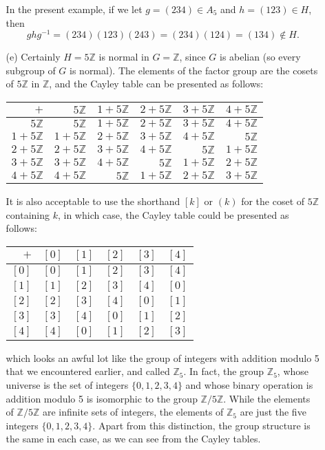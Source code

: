 \documentclass[12pt,reqno]{amsart}
\newcommand{\Z}{\ensuremath{\mathbb{Z}}}
\newcommand{\<}{\ensuremath{\langle}}
\renewcommand{\>}{\ensuremath{\rangle}}
\begin{document}
\begin{enumerate}
\begin{enumerate}
In the present example, if we let $g = (234) \in A_5$ and $h = (123) \in H$,
then 
\[
ghg^{-1}  = (234)(123)(243) = (234)(124) = (134) \notin H.
\]
\item[(e)]
Certainly $H = 5 {\mathbb Z}$ is normal in $G = {\mathbb Z}$, since $G$ is
abelian (so every subgroup of $G$ is normal).  The elements of the factor group
are the cosets of $5\Z$ in $\Z$, and the Cayley table can be presented as follows:
\medskip
\begin{center}
\begin{tabular}{r|rrrrr}
  $+$ & $5\Z$ &$1+5\Z$&$2+5\Z$&$3+5\Z$&$4+5\Z$ \\
\hline
  $5\Z$ & $5\Z$ &$1+5\Z$&$2+5\Z$&$3+5\Z$&$4+5\Z$ \\
  $1+5\Z$ &$1+5\Z$&$2+5\Z$&$3+5\Z$&$4+5\Z$& $5\Z$  \\
  $2+5\Z$ &$2+5\Z$&$3+5\Z$&$4+5\Z$& $5\Z$&$1+5\Z$  \\
  $3+5\Z$ &$3+5\Z$&$4+5\Z$& $5\Z$&$1+5\Z$&$2+5\Z$  \\
  $4+5\Z$ &$4+5\Z$& $5\Z$&$1+5\Z$&$2+5\Z$&$3+5\Z$
\end{tabular}
\end{center}
\medskip

It is also acceptable to use the shorthand $[k]$ or $(k)$ for the coset of $5\Z$
containing $k$, in which case, the Cayley table could be presented as follows:

\medskip
\begin{center}
\begin{tabular}{r|rrrrr}
  $+$ & $[0]$ &$[1] $&$[2] $&$[3] $&$[4] $ \\
\hline
  $[0]$ & $[0]$ &$[1] $&$[2] $&$[3] $&$[4] $ \\
  $[1] $ &$[1] $&$[2] $&$[3] $&$[4] $& $[0]$  \\
  $[2] $ &$[2] $&$[3] $&$[4] $& $[0]$&$[1] $  \\
  $[3] $ &$[3] $&$[4] $& $[0]$&$[1] $&$[2] $  \\
  $[4] $ &$[4] $& $[0]$&$[1] $&$[2] $&$[3] $
\end{tabular}
\end{center}
\medskip
which looks an awful lot like the group of integers with addition modulo 5 that
we encountered earlier, and called $\Z_5$.  In fact,  the group 
$\Z_5$, whose universe is the set of integers $\{0, 1, 2, 3, 4\}$ and whose
binary operation is addition modulo 5 is isomorphic to the group $\Z/5\Z$.  
While the elements of $\Z/5\Z$ are infinite sets of integers, the elements of $\Z_5$
are just the five integers $\{0, 1, 2, 3, 4\}$.  Apart from this distinction, 
the group structure is the same in each case, as we can see from the Cayley
tables.


\end{enumerate}
\end{enumerate}
\end{document}
